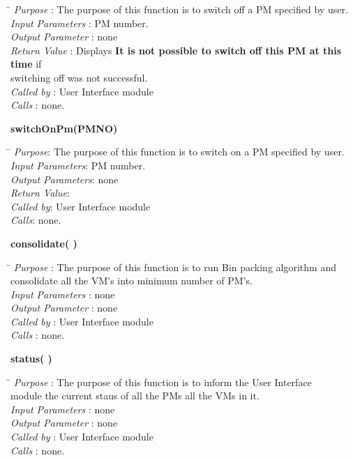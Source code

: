 \documentclass[a4paper,11pt]{article}
\begin{document}
\begin{itemize}
\begin{tabbing}
\hspace*{4cm}\= \kill
 \textit{Purpose} \> : The purpose of this function is to switch off a PM specified by user.\\
  \textit{Input Parameters} \> : PM number. \\
  \textit{Output Parameter} \> : none \\
  \textit{Return Value} \> : Displays \textbf{It is not possible to switch off this PM at this time} if \\ \>switching off was not successful. \\
  \textit{Called by} \> : User Interface module \\
  \textit{Calls} \> : none.\\
\end{tabbing}
\textbf{switchOnPm(PM\textunderscore NO)}
\begin{tabbing}
\hspace*{4cm}\=\kill
\textit{Purpose}\>: The purpose of this function is to switch on a PM specified by user. \\
\textit{Input Parameters}\>: PM number.\\
\textit{Output Parameters}\>: none\\
\textit{Return Value}\>:\\
\textit{Called by}\>: User Interface module\\
\textit{Calls}\>: none.\\
\end{tabbing}

\textbf{consolidate( )}
  
\begin{tabbing}
\hspace*{4cm}\= \kill
 \textit{Purpose} \> : The purpose of this function is to run Bin packing algorithm and \\ \> consolidate all the VM's into minimum number of PM's.\\
  \textit{Input Parameters} \> : none \\
  \textit{Output Parameter} \> : none \\
    \textit{Called by} \> : User Interface module \\
  \textit{Calls} \> : none.\\
\end{tabbing}
\textbf{status( )}
  
\begin{tabbing}
\hspace*{4cm}\= \kill
 \textit{Purpose} \> : The purpose of this function is to inform the User Interface\\ \> module the current staus of all the PMs all the VMs in it.\\
  \textit{Input Parameters} \> : none \\
  \textit{Output Parameter} \> : none \\
    \textit{Called by} \> : User Interface module \\
  \textit{Calls} \> : none.\\
\end{tabbing}
\end{itemize}
\end{document}
